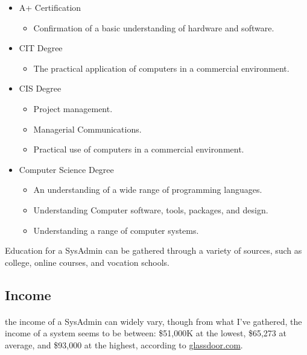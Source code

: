 \begin{itemize}
	\item{A+ Certification}
		\begin{itemize}
			\item{Confirmation of a basic understanding of hardware and software.\cite{comptia}}
		\end{itemize}
	\item{CIT Degree}
		\begin{itemize}
			\item{The practical application of computers in a commercial environment.\cite{davidhandlos}}
		\end{itemize}
	\item{CIS Degree}
		\begin{itemize}
			\item{Project management.\cite{davidhandlos}}
			\item{Managerial Communications.}
			\item{Practical use of computers in a commercial environment.\cite{davidhandlos}}
		\end{itemize}
	\item{Computer Science Degree}
		\begin{itemize}
			\item{An understanding of a wide range of programming languages.\cite{topuniversities}}
			\item{Understanding Computer software, tools, packages, and design.\cite{topuniversities}}
			\item{Understanding a range of computer systems.\cite{topuniversities}}
		\end{itemize}
\end{itemize}

Education for a SysAdmin can be gathered through a variety of sources, such as
college, online courses, and vocation schools.
\par

\subsection{Income}
\paragraph{}
the income of a SysAdmin can widely vary, though from what I've gathered, the
income of a system seems to be between: \$51,000K at the lowest, \$65,273 at
average, and \$93,000 at the highest\cite{glassdoor2016}, according to
\href{https://glassdoor.com}{glassdoor.com}.
\par

